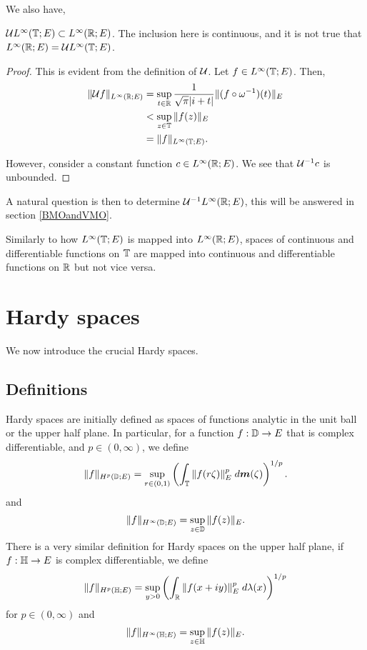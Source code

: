 \documentclass{unswmaths}
\begin{document}
We also have,
\begin{theorem}
    $\mathcal{U} L^\infty(\mathbb{T};E) \subset L^\infty(\mathbb{R};E)$. The inclusion
    here is continuous, and it is not true that $L^\infty(\mathbb{R};E) = \mathcal{U} L^\infty(\mathbb{T};E)$.
\end{theorem}
\begin{proof}
    This is evident from the definition of $\mathcal{U}$. Let $f \in L^\infty(\mathbb{T};E)$. Then,
    \begin{align*}
        \|\mathcal{U} f\|_{L^\infty(\mathbb{R};E)} &= \sup_{t \in \mathbb{R}} \frac{1}{\sqrt{\pi}|i+t|}\|(f\circ \omega^{-1})(t)\|_{E} \\
        &< \sup_{z \in \mathbb{T}} \|f(z)\|_E\\
        &= \|f\|_{L^\infty(\mathbb{T};E)}.
    \end{align*}
    
    However, consider a constant function $c \in L^\infty(\mathbb{R};E)$.
    We see that $\mathcal{U}^{-1}c$ is unbounded.
\end{proof}

A natural question is then to determine $\mathcal{U}^{-1}L^\infty(\mathbb{R};E)$, this will
be answered in section \ref{BMOandVMO}.

Similarly to how $L^\infty(\mathbb{T};E)$ is mapped into $L^\infty(\mathbb{R};E)$, spaces
of continuous and differentiable functions on $\mathbb{T}$ are mapped into
continuous and differentiable functions on $\mathbb{R}$ but not vice versa.


\section*{Hardy spaces}
We now introduce the crucial Hardy spaces.
\subsection*{Definitions}
Hardy spaces are initially defined as spaces of functions analytic in the unit
ball or the upper half plane.
In particular, for a function $f:\mathbb{D}\rightarrow E$
that is complex differentiable, and $p \in (0,\infty)$, we define
\begin{equation*}
    \|f\|_{H^p(\mathbb{D};E)} = \sup_{r \in (0,1)} \left(\int_{\mathbb{T}} \|f(r\zeta)\|_E^p\;d\boldsymbol{m}(\zeta)\right)^{1/p}.
\end{equation*}
and
\begin{equation*}
    \|f\|_{H^\infty(\mathbb{D};E)} = \sup_{z \in \mathbb{D}} \|f(z)\|_E.
\end{equation*}
There is a very similar definition for Hardy spaces on the upper half plane,
if $f:\mathbb{H}\rightarrow E$ is complex differentiable, we define
\begin{equation*}
    \|f\|_{H^p(\mathbb{H};E)} = \sup_{y>0} \left(\int_{\mathbb{R}} \|f(x+iy)\|_E^p\;d\lambda(x)\right)^{1/p}
\end{equation*}
for $p \in (0,\infty)$
and
\begin{equation*}
    \|f\|_{H^\infty(\mathbb{H};E)} = \sup_{z \in \mathbb{H}} \|f(z)\|_E.
\end{equation*} 
\end{document}
